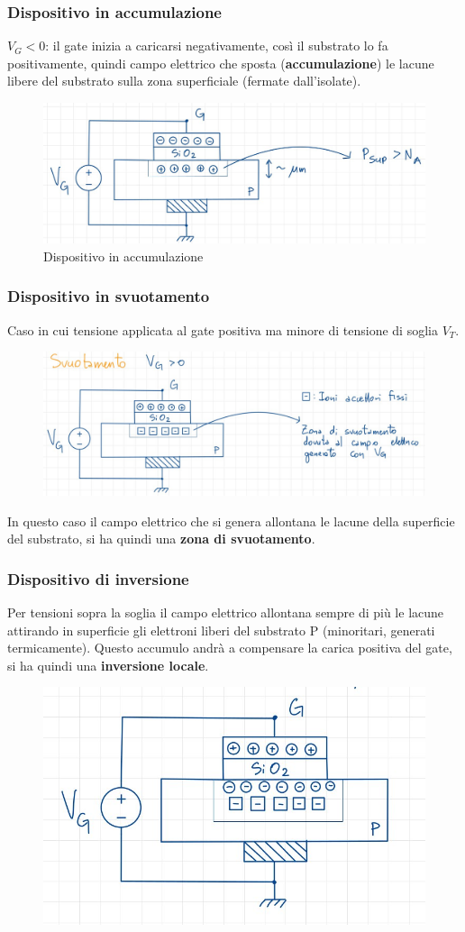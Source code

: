 \documentclass[11pt,a4paper,]{article}
\begin{document}
\subsubsection{Dispositivo in accumulazione}
$V_G<0$: il gate inizia a caricarsi negativamente, così il substrato lo fa positivamente, quindi campo elettrico che sposta (\textbf{accumulazione}) le lacune libere del substrato sulla zona superficiale (fermate dall'isolate).
\begin{figure}[H]
    \centering
    \includegraphics[width=0.5\linewidth]{img/disp in acc.png}
    \caption{Dispositivo in accumulazione}
\end{figure}
\subsubsection{Dispositivo in svuotamento}
Caso in cui tensione applicata al gate positiva ma minore di tensione di soglia $V_T$.
\begin{figure}[H]
    \centering
    \includegraphics[width=0.5\linewidth]{img/disp svuot.png}
\end{figure}
In questo caso il campo elettrico che si genera allontana le lacune della superficie del substrato, si ha quindi una \textbf{zona di svuotamento}.
\subsubsection{Dispositivo di inversione}
Per tensioni sopra la soglia il campo elettrico allontana sempre di più le lacune attirando in superficie gli elettroni liberi del substrato P (minoritari, generati termicamente).
Questo accumulo andrà a compensare la carica positiva del gate, si ha quindi una \textbf{inversione locale}.
\begin{figure}[H]
    \centering
    \includegraphics[width=0.5\linewidth]{img/disp inv.png}
\end{figure}
\end{document}
